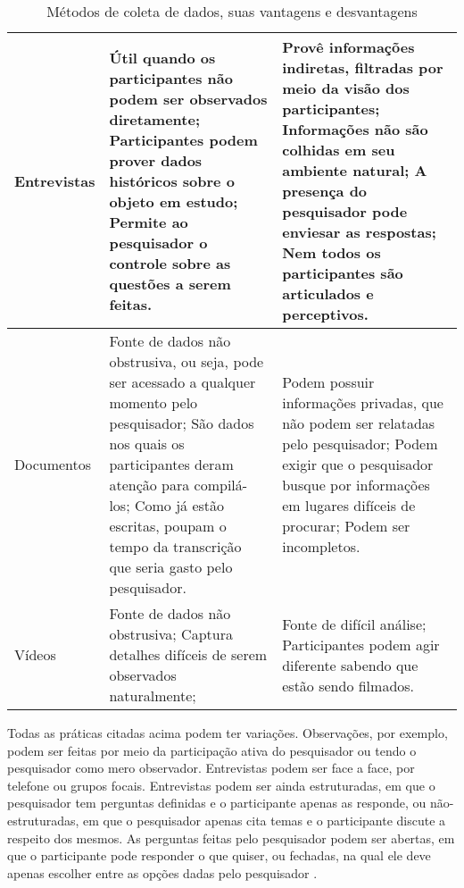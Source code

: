 \begin{table}
	\begin{tabular}{ | p{3cm} | p{6cm} | p{6cm} | }
		\hline
		Entrevistas &
		  Útil quando os participantes não podem ser observados diretamente;
		  Participantes podem prover dados históricos sobre o objeto em estudo;
		  Permite ao pesquisador o controle sobre as questões a serem feitas.
		&
		  Provê informações indiretas, filtradas por meio da visão dos
		  participantes;
		  Informações não são colhidas em seu ambiente natural;
		  A presença do pesquisador pode enviesar as respostas;
		  Nem todos os participantes são articulados e perceptivos.
		\\
		\hline
		Documentos &
		  Fonte de dados não obstrusiva, ou seja, pode ser acessado a qualquer
		  momento pelo pesquisador;
		  São dados nos quais os participantes deram atenção para compilá-los;
		  Como já estão escritas, poupam o tempo da transcrição que
		  seria gasto pelo pesquisador.
		&
		  Podem possuir informações privadas, que não podem ser relatadas pelo
		  pesquisador;
		  Podem exigir que o pesquisador busque por informações em lugares
		  difíceis de procurar;
		  Podem ser incompletos.
		\\		
		
		\hline
		
		Vídeos 
		&
		Fonte de dados não obstrusiva;
		Captura detalhes difíceis de serem observados naturalmente;
		&
		Fonte de difícil análise;
		Participantes podem agir diferente sabendo que estão sendo filmados.
		
		\\
		\hline
	\end{tabular}
	\caption{Métodos de coleta de dados, suas vantagens e desvantagens}
	\label{tab:coleta-de-dados}
\end{table}

Todas as práticas citadas acima podem ter variações. Observações, por exemplo,
podem ser feitas por meio da participação ativa do pesquisador ou tendo o
pesquisador como mero observador. Entrevistas podem ser face a face, por
telefone ou grupos focais. 
Entrevistas podem ser ainda estruturadas, em que o
pesquisador tem perguntas definidas e o participante apenas as responde, ou
não-estruturadas, em que o pesquisador apenas cita temas e o participante discute
a respeito dos mesmos. As perguntas feitas pelo pesquisador podem ser abertas,
em que o participante pode responder o que quiser, ou fechadas, na qual ele
deve apenas escolher entre as opções dadas pelo pesquisador \cite{seaman}.

